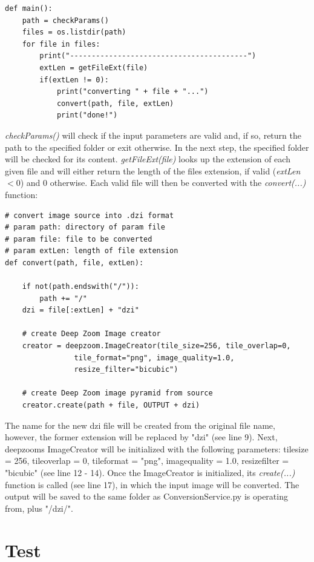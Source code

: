 \begin{lstlisting}[frame=single]
def main():
	path = checkParams()
	files = os.listdir(path)
	for file in files:
		print("-----------------------------------------")
		extLen = getFileExt(file)
		if(extLen != 0):
			print("converting " + file + "...")
			convert(path, file, extLen)
			print("done!")
\end{lstlisting}

\emph{checkParams()} will check if the input parameters are valid and, if so, return the path to the specified folder or exit otherwise. In the next step, the specified folder will be checked for its content. \emph{getFileExt(file)} looks up the extension of each given file and will either return the length of the files extension, if valid (\emph{extLen} $<0$) and $0$ otherwise. Each valid file will then be converted with the \emph{convert(...)} function:

\begin{lstlisting}[frame=single]
# convert image source into .dzi format
# param path: directory of param file
# param file: file to be converted
# param extLen: length of file extension
def convert(path, file, extLen):

	if not(path.endswith("/")):
		path += "/"
	dzi = file[:extLen] + "dzi"
	
	# create Deep Zoom Image creator
	creator = deepzoom.ImageCreator(tile_size=256, tile_overlap=0,
				tile_format="png", image_quality=1.0, 
				resize_filter="bicubic")

	# create Deep Zoom image pyramid from source
	creator.create(path + file, OUTPUT + dzi)
\end{lstlisting}

The name for the new dzi file will be created from the original file name, however, the former extension will be replaced by "dzi" (see line 9). Next, deepzooms ImageCreator will be initialized with the following parameters: tile{\textunderscore}size = 256, tile{\textunderscore}overlap = 0, tile{\textunderscore}format = "png", image{\textunderscore}quality = 1.0, resize{\textunderscore}filter = "bicubic" (see line 12 - 14). Once the ImageCreator is initialized, its \emph{create(...)} function is called (see line 17), in which the input image will be converted. The output will be saved to the same folder as ConversionService.py is operating from, plus "/dzi/".


\section{Test}

